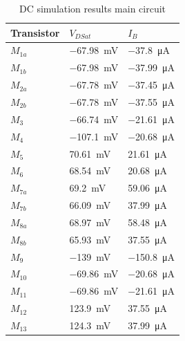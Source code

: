 \begin{table}[h]
    \centering
    \caption{DC simulation results main circuit}
    \begin{tabularx}{\textwidth}{>{\centering\arraybackslash}X >{\centering\arraybackslash}X >{\centering\arraybackslash}X}
        \toprule
        \textbf{Transistor} & \textbf{$V_{DSat}$} & \textbf{$I_B$}\\
        \midrule
        $M_{1a}$ & \SI{-67.98}{\milli\volt} & \SI{-37.8}{\micro\ampere}\\
        \midrule
        $M_{1b}$ & \SI{-67.98}{\milli\volt} & \SI{-37.99}{\micro\ampere}\\
        \midrule
        $M_{2a}$ & \SI{-67.78}{\milli\volt} & \SI{-37.45}{\micro\ampere}\\
        \midrule
        $M_{2b}$ & \SI{-67.78}{\milli\volt} & \SI{-37.55}{\micro\ampere}\\
        \midrule
        $M_{3}$ & \SI{-66.74}{\milli\volt} & \SI{-21.61}{\micro\ampere}\\
        \midrule
        $M_{4}$ & \SI{-107.1}{\milli\volt} & \SI{-20.68}{\micro\ampere}\\
        \midrule
        $M_{5}$ & \SI{70.61}{\milli\volt} & \SI{21.61}{\micro\ampere}\\
        \midrule
        $M_{6}$ & \SI{68.54}{\milli\volt} & \SI{20.68}{\micro\ampere}\\
        \midrule
        $M_{7a}$ & \SI{69.2}{\milli\volt} & \SI{59.06}{\micro\ampere}\\
        \midrule
        $M_{7b}$ & \SI{66.09}{\milli\volt} & \SI{37.99}{\micro\ampere}\\
        \midrule
        $M_{8a}$ & \SI{68.97}{\milli\volt} & \SI{58.48}{\micro\ampere}\\
        \midrule
        $M_{8b}$ & \SI{65.93}{\milli\volt} & \SI{37.55}{\micro\ampere}\\
        \midrule
        $M_{9}$ & \SI{-139}{\milli\volt} & \SI{-150.8}{\micro\ampere}\\
        \midrule
        $M_{10}$ & \SI{-69.86}{\milli\volt} & \SI{-20.68}{\micro\ampere}\\
        \midrule
        $M_{11}$ & \SI{-69.86}{\milli\volt} & \SI{-21.61}{\micro\ampere}\\
        \midrule
        $M_{12}$ & \SI{123.9}{\milli\volt} & \SI{37.55}{\micro\ampere}\\
        \midrule
        $M_{13}$ & \SI{124.3}{\milli\volt} & \SI{37.99}{\micro\ampere}\\
        \bottomrule
    \end{tabularx}
    \label{tab:DC-RFC}
\end{table}

